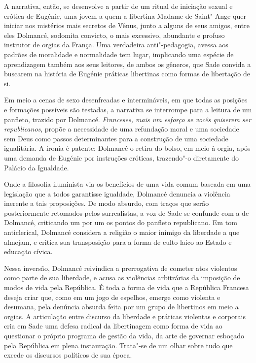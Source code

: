 A narrativa, então, se desenvolve a partir de um ritual de iniciação
sexual e erótica de Eugénie, uma jovem a quem a libertina Madame de
Saint"-Ange quer iniciar nos mistérios mais secretos de Vênus, junto a
alguns de seus amigos, entre eles Dolmancé, sodomita convicto, o mais
excessivo, abundante e profuso instrutor de orgias da França. Uma
verdadeira anti"-pedagogia, avessa aos padrões de moralidade e
normalidade tem lugar, implicando uma espécie de aprendizagem também aos
seus leitores, de ambos os gêneros, que Sade convida a buscarem na
história de Eugénie práticas libertinas como formas de libertação
de si.

Em meio a cenas de sexo desenfreadas e intermináveis, em que todas as
posições e formações possíveis são testadas, a narrativa se interrompe
para a leitura de um panfleto, trazido por Dolmancé. \emph{Franceses,
mais um esforço se vocês quiserem ser republicanos}, propõe a
necessidade de uma refundação moral e uma sociedade sem Deus como passos
determinantes para a construção de uma sociedade igualitária. A ironia é
patente: Dolmancé o retira do bolso, em meio à orgia, após uma demanda
de Eugénie por instruções eróticas, trazendo"-o diretamente do Palácio da
Igualdade.

Onde a filosofia iluminista via os benefícios de uma vida comum baseada
em uma legislação que a todos garantisse igualdade, Dolmancé denuncia a
violência inerente a tais proposições. De modo absurdo, com traços que
serão posteriormente retomados pelos surrealistas, a voz de Sade se confunde
com a de Dolmancé, criticando um por um os
pontos do panfleto republicano. Em tom anticlerical, Dolmancé considera a
religião o maior inimigo da liberdade a que almejam, e critica sua transposição
para a forma de culto laico ao Estado e educação cívica.

Nessa inversão, Dolmancé reivindica a prerrogativa de cometer atos
violentos como parte de sua liberdade, e acusa as violências arbitrárias
da imposição de modos de vida pela República. É toda a forma de
vida que a República Francesa deseja criar que, como em um jogo de
espelhos, emerge como violenta e desumana, pela denúncia absurda feita
por um grupo de libertinos em meio a orgias. A articulação entre
discurso da liberdade e práticas violentas e corporais cria em Sade uma
defesa radical da libertinagem como forma de vida ao questionar o
próprio programa de gestão da vida, da arte de governar esboçado pela
República em plena instauração. Trata"-se de um olhar sobre tudo que
excede os discursos políticos de sua época.

